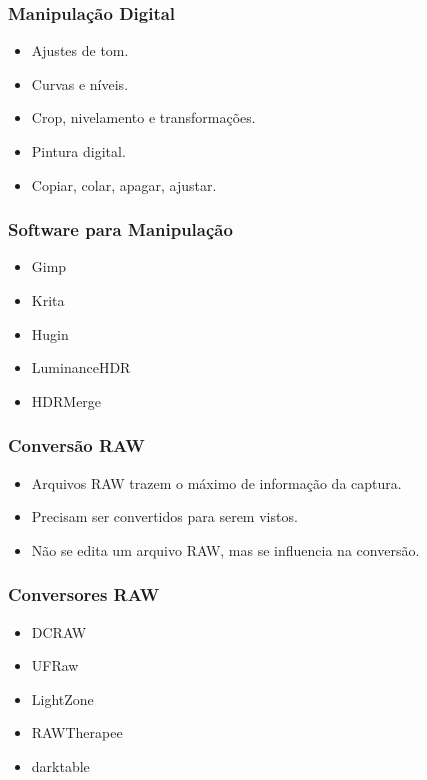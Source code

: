 \begin{frame}
    \frametitle{Manipulação Digital}
    \begin{itemize}
        \item Ajustes de tom.
        \item Curvas e níveis.
        \item Crop, nivelamento e transformações.
        \item Pintura digital.
        \item Copiar, colar, apagar, ajustar.
    \end{itemize}
\end{frame}


\begin{frame}
    \frametitle{Software para Manipulação}
    \begin{itemize}
        \item Gimp
        \item Krita
        \item Hugin
        \item LuminanceHDR
        \item HDRMerge
    \end{itemize}
\end{frame}

\begin{frame}
    \frametitle{Conversão RAW}
    \begin{itemize}
        \item Arquivos RAW trazem o máximo de informação da captura.
        \item Precisam ser convertidos para serem vistos.
        \item Não se edita um arquivo RAW, mas se influencia na conversão.
    \end{itemize}
\end{frame}

\begin{frame}
    \frametitle{Conversores RAW}
    \begin{itemize}
        \item DCRAW
        \item UFRaw
        \item LightZone
        \item RAWTherapee
        \item darktable
    \end{itemize}
\end{frame}

